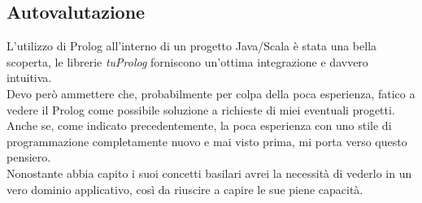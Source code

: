 \documentclass[10pt,italian]{article} %
\begin{document}
\subsection{Autovalutazione}
L'utilizzo di Prolog all'interno di un progetto Java/Scala è stata una bella scoperta, le librerie \textit{tuProlog} forniscono un'ottima integrazione e davvero intuitiva. \\
Devo però ammettere che, probabilmente per colpa della poca esperienza, fatico a vedere il Prolog come possibile soluzione a richieste di miei eventuali progetti. 
\\
Anche se, come indicato precedentemente, la poca esperienza con uno stile di programmazione completamente nuovo e mai visto prima, mi porta verso questo pensiero. \\
Nonostante abbia capito i suoi concetti basilari avrei la necessità di vederlo in un vero dominio applicativo, così da riuscire a capire le sue piene capacità. 


 
\end{document}
